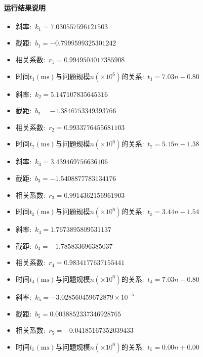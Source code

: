\documentclass[a4 paper,fontset=windows]{ctexart}
\begin{document}
	\paragraph{运行结果说明}
	\begin{itemize}
		\item 斜率:\ $k_1=7.030557596121503$
		\item 截距:\ $b_1=-0.7999599325301242$
		\item 相关系数:\ $r_1=0.9949504017385908$
		\item 时间$t_1(\mathrm{ms})$与问题规模$n(\times10^6)$的关系:\ $t_1=7.03n-0.80$
	\end{itemize}
	\bigskip
	\begin{itemize}
		\item 斜率:\ $k_2=5.147107835645316$
		\item 截距:\ $b_2=-1.3846753349393766$
		\item 相关系数:\ $r_2=0.9933776455681103$
		\item 时间$t_2(\mathrm{ms})$与问题规模$n(\times10^6)$的关系:\ $t_2=5.15n-1.38$
	\end{itemize}
	\bigskip
	\begin{itemize}
		\item 斜率:\ $k_3=3.439469756636106$
		\item 截距:\ $b_3=-1.5408877783134176$
		\item 相关系数:\ $r_3=0.9914362156961903$
		\item 时间$t_3(\mathrm{ms})$与问题规模$n(\times10^6)$的关系:\ $t_3=3.44n-1.54$
	\end{itemize}
	\bigskip
	\begin{itemize}
		\item 斜率:\ $k_4=1.7673895809531137$
		\item 截距:\ $b_4=-1.785833696385037$
		\item 相关系数:\ $r_4=0.9834177637155441$
		\item 时间$t_4(\mathrm{ms})$与问题规模$n(\times10^6)$的关系:\ $t_4=7.03n-0.80$
	\end{itemize}
	\bigskip
	\begin{itemize}
		\item 斜率:\ $k_5=-3.028560459672879\times10^{-5}$
		\item 截距:\ $b_5=0.0038852337346928765$
		\item 相关系数:\ $r_5=-0.04185167352039433$
		\item 时间$t_5(\mathrm{ms})$与问题规模$n(\times10^6)$的关系:\ $t_5=0.00n+0.00$
	\end{itemize}
\end{document}
